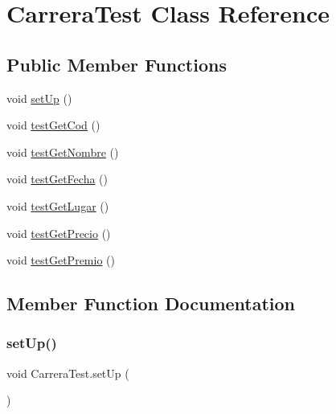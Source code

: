\hypertarget{class_carrera_test}{}\section{Carrera\+Test Class Reference}
\label{class_carrera_test}
\subsection*{Public Member Functions}
\begin{DoxyCompactItemize}
\item 
void \mbox{\hyperlink{class_carrera_test_ac6d3b15d8df501442b47edcac2cc0caf}{set\+Up}} ()
\item 
void \mbox{\hyperlink{class_carrera_test_ab42ba1aa5b6a78c2c3a970100911702d}{test\+Get\+Cod}} ()
\item 
void \mbox{\hyperlink{class_carrera_test_aa5f89ec4be4d345d7f2b7331821415cd}{test\+Get\+Nombre}} ()
\item 
void \mbox{\hyperlink{class_carrera_test_a7313b1e9c22029753dd39c7ae4fd5044}{test\+Get\+Fecha}} ()
\item 
void \mbox{\hyperlink{class_carrera_test_a34b8f775dcc547ce1c27af2b07df3b74}{test\+Get\+Lugar}} ()
\item 
void \mbox{\hyperlink{class_carrera_test_abbedc0671839401d1312ddf20b60a48f}{test\+Get\+Precio}} ()
\item 
void \mbox{\hyperlink{class_carrera_test_a98adb151ad831f74469b79f1c9f3c43f}{test\+Get\+Premio}} ()
\end{DoxyCompactItemize}


\subsection{Member Function Documentation}
\mbox{\label{class_carrera_test_ac6d3b15d8df501442b47edcac2cc0caf}} 
\subsubsection{\texorpdfstring{setUp()}{setUp()}}
{\footnotesize\ttfamily void Carrera\+Test.\+set\+Up (\begin{DoxyParamCaption}{ }\end{DoxyParamCaption})}

\mbox{\label{class_carrera_test_ab42ba1aa5b6a78c2c3a970100911702d}} 
